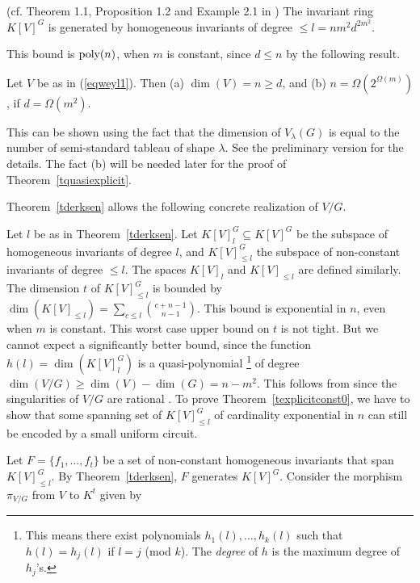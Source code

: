 \documentclass[11pt]{article}
\begin{document}
\begin{theorem}[Derksen](cf. Theorem 1.1, Proposition 1.2 and Example 2.1   in \cite{derksen}) \label{tderksen}
The invariant ring $K[V]^G$ is generated by homogeneous invariants of degree $\le l= n m^2 d^{2 m^2}$.
\end{theorem} 

This bound is ${\mbox {poly}}(n)$, when $m$ is constant, since $d \le n$ by the following result.

\begin{lemma} \label{lbound}
Let $V$ be as in (\ref{eqweyl1}). Then (a) $\dim(V)=n \ge d$, and 
(b) $n=\Omega(2^{\Omega(m)})$, if $d = \Omega(m^2)$. 
\end{lemma} 

This can be  shown using 
the fact that the dimension of $V_\lambda(G)$ is equal \cite{fultonrepr} 
to the number of semi-standard tableau of shape $\lambda$. See the preliminary version \cite{GCT5focs}  for the details. The fact (b) will be needed later 
for  the proof of Theorem~\ref{tquasiexplicit}. 


Theorem~\ref{tderksen}  allows the following concrete realization of $V/G$.

Let $l$ be as in Theorem~\ref{tderksen}.
Let $K[V]^G_l \subseteq K[V]^G$ be the subspace
of homogeneous invariants of degree $l$, and $K[V]^G_{\le l}$ the subspace of non-constant invariants of degree $\le l$.  The spaces $K[V]_l$ and $K[V]_{\le l}$ are defined similarly.
The dimension $t$ of $K[V]^G_{\le l}$  is bounded by $\dim(K[V]_{\le l})=\sum_{c\le l}  {c+n-1 \choose n-1}$. This  bound is exponential in $n$, even
when $m$ is constant. This worst case upper bound on $t$ is not tight. But we cannot expect a significantly better bound, since
the function $h(l)=\dim(K[V]^G_l)$ is a quasi-polynomial \footnote{This means there exist polynomials $h_1(l), \ldots, h_k(l)$
such that $h(l)=h_j(l)$ if $l=j$ (mod $k$). The {\em degree} of $h$ is the maximum degree of $h_j$'s.}
of degree $\dim(V/G)\ge \dim(V)-\dim(G)=n-m^2$. This follows from \cite{flenner}  since  the singularities of $V/G$ 
are rational \cite{boutot}. To prove
Theorem~\ref{texplicitconst0}, we have  to show 
that some spanning set of $K[V]^G_{\le l}$  of  cardinality exponential in $n$ can still be encoded by a small uniform circuit.



Let $F=\{f_1,\ldots,f_t\}$ be a set of  non-constant  homogeneous invariants that span
$K[V]^G_{\le l}$.
By Theorem~\ref{tderksen},  $F$ generates  $K[V]^G$.
Consider the morphism $\pi_{V/G}$ from $V$ to $K^t$ given by 
\end{document}
